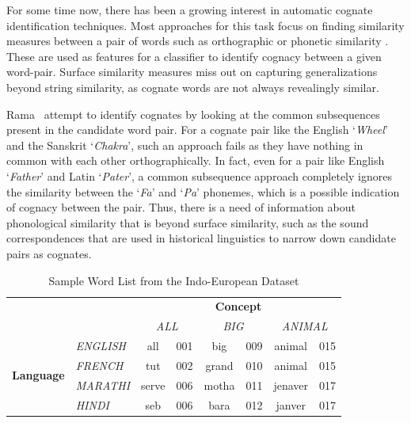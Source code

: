 \documentclass[11pt,letterpaper]{article}
\begin{document}
For some time now, there has been a growing interest in automatic cognate identification techniques. Most approaches for this task focus on finding similarity measures between a pair of words such as orthographic or phonetic similarity \cite{hauer2011clustering} \cite{inkpen2005similarity} \cite{List2016g}. These are used as features for a classifier to identify cognacy between a given word-pair. Surface similarity measures miss out on capturing generalizations beyond string similarity, as cognate words are not always revealingly similar. 

Rama~ attempt to identify cognates by looking at the common subsequences present in the candidate word pair. For a cognate pair like the English `\textit{Wheel}' and the Sanskrit `\textit{Chakra}', such an approach fails as they have nothing in common with each other orthographically. In fact, even for a pair like English `\textit{Father}' and Latin `\textit{Pater}', a common subsequence approach completely ignores the similarity between the `\textit{Fa}' and `\textit{Pa}' phonemes, which is a possible indication of cognacy between the pair. Thus, there is a need of information about phonological similarity that is beyond surface similarity, such as the sound correspondences that are used in historical linguistics to narrow down candidate pairs as cognates.

\begin{table}[ht]
\centering
\begin{tabular}{llcccccc}
\multicolumn{1}{c}{\textbf{}}                           & \multicolumn{1}{c}{\textbf{}}         & \multicolumn{6}{c}{\textbf{Concept}}                                                                      \\ \cline{3-8} 
\multicolumn{1}{c}{}                                    & \multicolumn{1}{c}{\textit{}}         & \multicolumn{2}{c}{\textit{ALL}} & \multicolumn{2}{c}{\textit{BIG}} & \multicolumn{2}{c}{\textit{ANIMAL}} \\ \cline{3-8} 
\multicolumn{1}{l|}{\multirow{4}{*}{\textbf{Language}}} & \multicolumn{1}{l|}{\textit{ENGLISH}} & all   & \multicolumn{1}{c|}{001} & big   & \multicolumn{1}{c|}{009} & animal   & \multicolumn{1}{c|}{015} \\ \cline{3-8} 
\multicolumn{1}{l|}{}                                   & \multicolumn{1}{l|}{\textit{FRENCH}}  & tut   & \multicolumn{1}{c|}{002} & grand & \multicolumn{1}{c|}{010} & animal   & \multicolumn{1}{c|}{015} \\ \cline{3-8} 
\multicolumn{1}{l|}{}                                   & \multicolumn{1}{l|}{\textit{MARATHI}} & serve & \multicolumn{1}{c|}{006} & motha & \multicolumn{1}{c|}{011} & jenaver  & \multicolumn{1}{c|}{017} \\ \cline{3-8} 
\multicolumn{1}{l|}{}                                   & \multicolumn{1}{l|}{\textit{HINDI}}   & seb   & \multicolumn{1}{c|}{006} & bara  & \multicolumn{1}{c|}{012} & janver   & \multicolumn{1}{c|}{017} \\ \cline{3-8} 
\end{tabular}
\label{sample_wordlist}
\caption{Sample Word List from the Indo-European Dataset}
\end{table}
\end{document}
